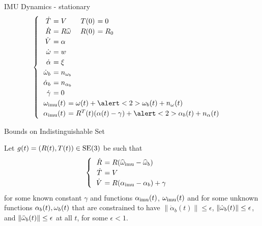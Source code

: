 \begin{tframe}{IMU Dynamics - stationary}
\begin{equation}
\begin{cases}
\begin{tabular}{>{$}r<{$} >{$\!\!\!\!\!}l<{$} >{$}r<{$} >{$\!\!\!\!\!}l<{$}}
\dot T &= V & T(0) &= 0 \\
\dot R &= R \widehat \w & R(0) &= R_0\\
\dot V &= \alpha \\ %
\dot \w &= w\\ %
\dot \alpha &= \xi \\%
\dot \w_b &= n_{\w_b}  \\
\dot \alpha_b &= n_{\alpha_b}  \\ 
\dot \gamma &= 0 \\
\end{tabular}\\
\begin{tabular}{>{$}r<{$} >{$\!\!\!\!\!}l<{$}}
\w\imu (t) &= \w(t) + \alert<2>{\w_b(t)} + n_{\w}(t) \\ 
\alpha\imu (t) &= R^T(t) (\alpha(t)- \gamma) + \alert<2>{\alpha_b(t)} + n_{\alpha}(t) 
\end{tabular}
\end{cases}
\end{equation}
\end{tframe}
 
\begin{tframe}{Bounds on Indistinguishable Set}
\begin{claim}\label{claim-five}
Let $g(t)= (R(t), T(t)) \in \operatorname{SE}(3)$ be such that
\begin{equation}
\begin{cases}
\begin{tabular}{>{$}r<{$} >{$\!\!\!\!\!}l<{$}}
\dot R &= R(\hw\imu  - \hw_b) \\
\dot T &= V \\
\dot V &= R(\alpha\imu  - \alpha_b) + \gamma
\end{tabular}
\end{cases}
\label{eq-model-dyn}
\end{equation}
for some known constant $\gamma$ and functions $\alpha_\mathrm{imu} (t)$, $\omega_\mathrm{imu} (t)$ and for some unknown functions $\alpha_b(t), \omega_b(t)$ that are constrained to have $\| \dot \alpha_b(t) \| \le \epsilon$, $\| \dot {\omega}_b(t) \| \le \epsilon$, and $\|\ddot{\omega}_b(t)\|\le\epsilon$ at all $t$,
for some $\epsilon<1$.
\end{claim}
\end{tframe}

